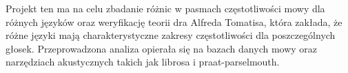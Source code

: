 Projekt ten ma na celu zbadanie różnic w pasmach częstotliwości mowy dla różnych języków oraz weryfikację teorii dra Alfreda Tomatisa, która zakłada, że różne języki mają charakterystyczne zakresy częstotliwości dla poszczególnych głosek. Przeprowadzona analiza opierała się na bazach danych mowy oraz narzędziach akustycznych takich jak librosa i praat-parselmouth.
